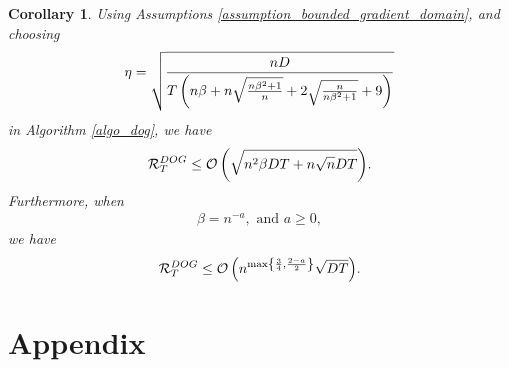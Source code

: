 \documentclass{article}
\newtheorem{Corollary}{\bf{Corollary}}
\begin{document}
\begin{Corollary}
Using Assumptions \ref{assumption_bounded_gradient_domain}, and choosing 
\begin{align}
\nonumber
\eta = \sqrt{\frac{nD}{T\left( n\beta + n\sqrt{\frac{n\beta^2+1}{n}} + 2\sqrt{\frac{n}{n\beta^2+1}} + 9  \right)}}
\end{align} in Algorithm \ref{algo_dog}, we have
\begin{align}
\nonumber
{\mathcal{R}}_T^{DOG} \le {\mathcal{O}\left( \sqrt{ n^2\beta DT + n\sqrt{n}DT} \right)}.
\end{align} Furthermore, when 
\begin{align}
\nonumber
\beta = n^{-a}, \text{ and } a \ge 0,
\end{align} we have
\begin{align}
\nonumber
{\mathcal{R}}_T^{DOG} \le {\mathcal{O}\left( n^{\max\left\{\frac{3}{4}, \frac{2-a}{2}\right\}}\sqrt{DT} \right)}.
\end{align}






\end{Corollary}








\section*{Appendix}
\end{document}
